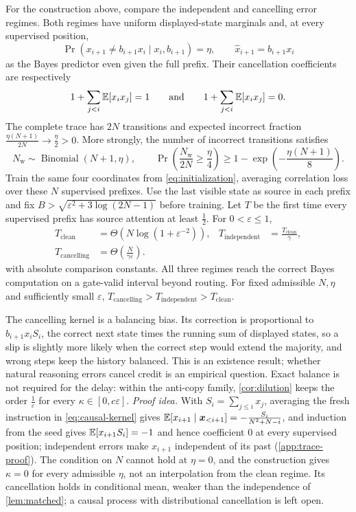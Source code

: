 \begin{mainresult}\begin{theorem}
\label{thm:causal}
For the construction above, compare the independent and cancelling error regimes.
Both regimes have uniform displayed-state marginals and, at every supervised position,
\[
 \Pr(x_{i+1}\ne b_{i+1}x_i\mid x_i,b_{i+1})=\eta,
 \qquad \hat x_{i+1}=b_{i+1}x_i
\]
as the Bayes predictor even given the full prefix.
Their cancellation coefficients are respectively
\[
 1+\sum_{j<i}\mathbb E[x_i x_j]=1\qquad\text{and}\qquad
 1+\sum_{j<i}\mathbb E[x_i x_j]=0.
\]
The complete trace has $2N$ transitions and expected incorrect fraction
$\tfrac{\eta(N+1)}{2N}\to\tfrac{\eta}{2}>0$.
More strongly, the number of incorrect transitions satisfies
\[
 N_{\mathrm w}\sim\operatorname{Binomial}(N+1,\eta),\qquad
 \Pr\!\left(\frac{N_{\mathrm w}}{2N}\ge\frac{\eta}{4}\right)
 \ge1-\exp\!\left(-\frac{\eta(N+1)}{8}\right).
\]
Train the same four coordinates from \cref{eq:initialization}, averaging correlation loss over these $N$ supervised prefixes.
Use the last visible state as source in each prefix and fix $B>\sqrt{\varepsilon^2+3\log(2N-1)}$ before training.
Let $T$ be the first time every supervised prefix has source attention at least $\tfrac{1}{2}$.
For $0<\varepsilon\le1$,
\begin{align*}
 T_{\mathrm{clean}}&=\Theta(N\log(1+\varepsilon^{-2})),&
 T_{\mathrm{independent}}&=\frac{T_{\mathrm{clean}}}{\gamma},\\
 T_{\mathrm{cancelling}}&=\Theta\!\left(\frac{N}{\gamma\varepsilon}\right).
\end{align*}
with absolute comparison constants. All three regimes reach the correct Bayes computation on a gate-valid interval beyond routing.
For fixed admissible $N,\eta$ and sufficiently small $\varepsilon$, $T_{\mathrm{cancelling}}>T_{\mathrm{independent}}>T_{\mathrm{clean}}$.
\end{theorem}\end{mainresult}
The cancelling kernel is a balancing bias. Its correction is proportional to $b_{i+1}x_i S_i$, the correct next state times the running sum of
displayed states, so a slip is slightly more likely when the correct step would extend the majority, and wrong steps keep the history balanced.
This is an existence result; whether natural reasoning errors cancel credit is an empirical question.
Exact balance is not required for the delay: within the anti-copy family, \cref{cor:dilution} keeps the order $\tfrac{1}{\varepsilon}$ for every
$\kappa\in[0,c\varepsilon]$.
\emph{Proof idea.} With $S_i=\sum_{j\le i}x_j$, averaging the fresh instruction in \cref{eq:causal-kernel} gives $\mathbb E[x_{i+1}\mid\bm x_{<i+1}]=-\tfrac{S_i}{N^2+N-i}$,
and induction from the seed gives $\mathbb E[x_{i+1}S_i]=-1$ and hence coefficient $0$ at every supervised position; independent errors make $x_{i+1}$ independent of its past (\cref{app:trace-proof}).
The condition on $N$ cannot hold at $\eta=0$, and the construction gives $\kappa=0$ for every admissible $\eta$, not an interpolation from the clean regime.
Its cancellation holds in conditional mean, weaker than the independence of \cref{lem:matched}; a causal process with distributional cancellation is left open.

